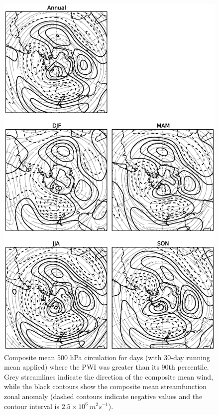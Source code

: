 \begin{figure}
\begin{center}
\includegraphics[width=0.7\columnwidth]{figures/zonalwaves/sf-composite_pwigt90pct_ERAInterim_500hPa_030day-runmean_native-zonal-anom-shextropics15.eps}
\caption{\label{fig:pwi_spatial_summary}
Composite mean 500 hPa circulation for days (with 30-day running mean applied) where the PWI was greater than its 90th percentile. Grey streamlines indicate the direction of the composite mean wind, while the black contours show the composite mean streamfunction zonal anomaly (dashed contours indicate negative values and the contour interval is $2.5 \times 10^6 \: m^2 s^{-1}$).}
\end{center}
\end{figure}

